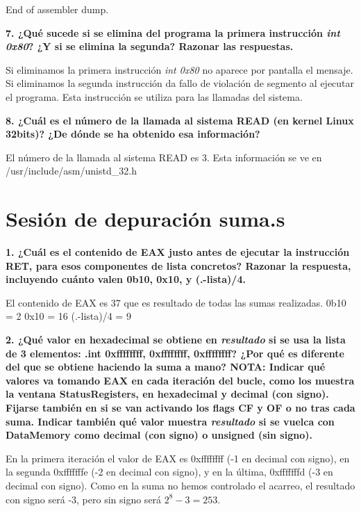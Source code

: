 \documentclass{article}
\begin{document}
  \begin{flushleft}
    End of assembler dump.
  \end{flushleft}

  \begin{flushleft}
    \textbf{7. ¿Qué sucede si se elimina del programa la primera instrucción \textit{int 0x80}?
    ¿Y si se elimina la segunda? Razonar las respuestas.} \break

    Si eliminamos la primera instrucción \textit{int 0x80} no aparece por pantalla el mensaje. \break
    Si eliminamos la segunda instrucción da fallo de violación de segmento al ejecutar el programa. \break
    Esta instrucción se utiliza para las llamadas del sistema.
  \end{flushleft}

  \begin{flushleft}
    \textbf{8. ¿Cuál es el número de la llamada al sistema READ (en kernel Linux 32bits)?
    ¿De dónde se ha obtenido esa información?} \break \break

    El número de la llamada al sistema READ es 3. \break
    Esta información se ve en /usr/include/asm/unistd\_32.h
  \end{flushleft}

\newpage
\section{Sesión de depuración suma.s}

  \begin{flushleft}
    \textbf{1. ¿Cuál es el contenido de EAX justo antes de ejecutar la instrucción RET,
    para esos componentes de lista concretos? Razonar la respuesta, incluyendo cuánto
    valen 0b10, 0x10, y (.-lista)/4.} \break

    El contenido de EAX es 37 que es resultado de todas las sumas realizadas. \break
    0b10 = 2 \break
    0x10 = 16 \break
    (.-lista)/4 = 9
  \end{flushleft}

  \begin{flushleft}
    \textbf{2. ¿Qué valor en hexadecimal se obtiene en \textit{resultado} si se usa la lista
    de 3 elementos: .int 0xffffffff, 0xffffffff, 0xffffffff? ¿Por qué es diferente
    del que se obtiene haciendo la suma a mano? NOTA: Indicar qué valores va tomando
    EAX en cada iteración del bucle, como los muestra la ventana Status\textrightarrow Registers, en
    hexadecimal y decimal (con signo). Fijarse también en si se van activando los flags
    CF y OF o no tras cada suma. Indicar también qué valor muestra \textit{resultado} si se vuelca
    con Data\textrightarrow Memory como decimal (con signo) o unsigned (sin signo).} \break

    En la primera iteración el valor de EAX es 0xffffffff (-1 en decimal con signo),
    en la segunda 0xfffffffe (-2 en decimal con signo), y en la última, 0xfffffffd
    (-3 en decimal con signo). Como en la suma no hemos controlado el acarreo,
    el resultado con signo será -3, pero sin signo será $2^{8}-3 = 253$.
  \end{flushleft}
\end{document}
